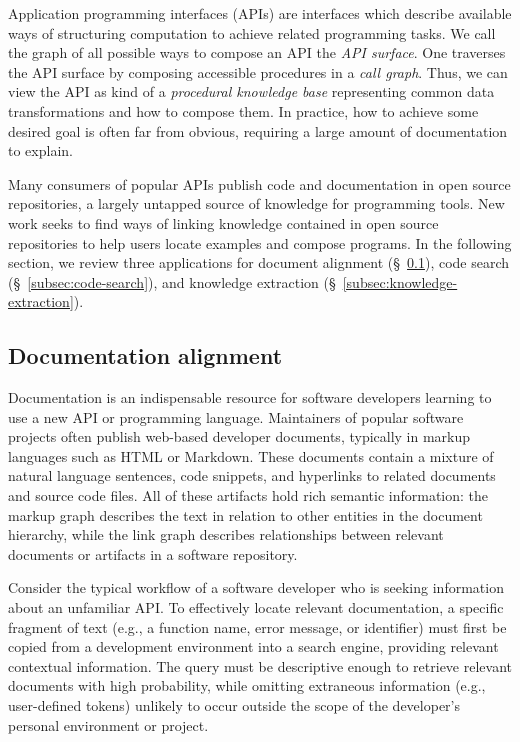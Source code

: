 \documentclass[12pt]{article}
\begin{document}
Application programming interfaces (APIs) are interfaces which describe available ways of structuring computation to achieve related programming tasks. We call the graph of all possible ways to compose an API the \textit{API surface}. One traverses the API surface by composing accessible procedures in a \textit{call graph}. Thus, we can view the API as kind of a \textit{procedural knowledge base} representing common data transformations and how to compose them. In practice, how to achieve some desired goal is often far from obvious, requiring a large amount of documentation to explain.

Many consumers of popular APIs publish code and documentation in open source repositories, a largely untapped source of knowledge for programming tools. New work seeks to find ways of linking knowledge contained in open source repositories to help users locate examples and compose programs. In the following section, we review three applications for document alignment (\S~\ref{subsec:tracelink}), code search (\S~\ref{subsec:code-search}), and knowledge extraction (\S~\ref{subsec:knowledge-extraction}).

\subsection{Documentation alignment}\label{subsec:tracelink}

Documentation is an indispensable resource for software developers learning to use a new API or programming language. Maintainers of popular software projects often publish web-based developer documents, typically in markup languages such as HTML or Markdown. These documents contain a mixture of natural language sentences, code snippets, and hyperlinks to related documents and source code files. All of these artifacts hold rich semantic information: the markup graph describes the text in relation to other entities in the document hierarchy, while the link graph describes relationships between relevant documents or artifacts in a software repository.

Consider the typical workflow of a software developer who is seeking information about an unfamiliar API. To effectively locate relevant documentation, a specific fragment of text (e.g., a function name, error message, or identifier) must first be copied from a development environment into a search engine, providing relevant contextual information. The query must be descriptive enough to retrieve relevant documents with high probability, while omitting extraneous information (e.g., user-defined tokens) unlikely to occur outside the scope of the developer's personal environment or project.
\end{document}
